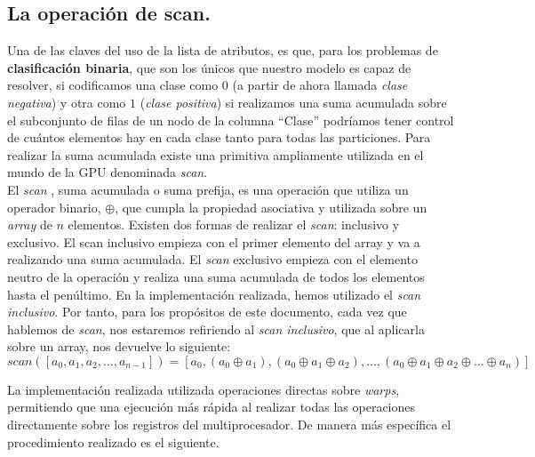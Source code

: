 \subsection{La operación de scan.}
Una de las claves del uso de la lista de atributos, es que, para los problemas de \textbf{clasificación binaria}, que son los únicos que nuestro modelo es capaz de resolver, si codificamos una clase como $0$ (a partir de ahora llamada \textit{clase negativa}) y otra como $1$ (\textit{clase positiva}) si realizamos una suma acumulada sobre el subconjunto de filas de un nodo de la columna ``Clase'' podríamos tener control de cuántos elementos hay en cada clase tanto para todas las particiones. Para realizar la suma acumulada existe una primitiva ampliamente utilizada en el mundo de la GPU denominada \textit{scan}.\\

El \textit{scan} \cite{scan}, suma acumulada o suma prefija, es una operación que utiliza un operador binario, $\oplus$, que cumpla la propiedad asociativa y utilizada sobre un \textit{array} de $n$ elementos. Existen dos formas de realizar el \textit{scan}: inclusivo y exclusivo. El scan inclusivo empieza con el primer elemento del array y va a realizando una suma acumulada. El \textit{scan} exclusivo empieza con el elemento neutro de la operación y realiza una suma acumulada de todos los elementos hasta el penúltimo. En la implementación realizada, hemos utilizado el \textit{scan inclusivo}. Por tanto, para los propósitos de este documento, cada vez que hablemos de \textit{scan}, nos estaremos refiriendo al \textit{scan inclusivo}, que al aplicarla sobre un array, nos devuelve lo siguiente:\\
$$scan([a_0, a_1, a_2, ..., a_{n-1}]) = [ a_0, (a_0 \oplus a_1), (a_0 \oplus a_1 \oplus a_2), ..., (a_0 \oplus a_1 \oplus a_2 \oplus ... \oplus a_{n})]$$

La implementación realizada utilizada operaciones directas sobre \textit{warps}, permitiendo que una ejecución más rápida al realizar todas las operaciones directamente sobre los registros del multiprocesador. De manera más específica el procedimiento realizado es el siguiente.\\

